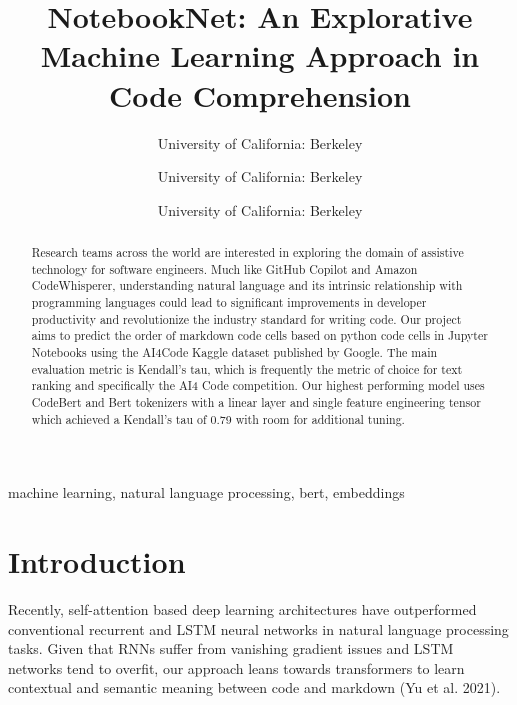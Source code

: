 \documentclass[conference]{IEEEtran}
\begin{document}
\title{NotebookNet: An Explorative Machine Learning Approach in Code Comprehension }

\author{
University of California: Berkeley
\and
{}
University of California: Berkeley
\and
{}
University of California: Berkeley}

\maketitle

\thispagestyle{firstpagefooter}

\begin{abstract}
Research teams across the world are interested in exploring the domain of assistive technology for software engineers. Much like GitHub Copilot and Amazon CodeWhisperer, understanding natural language and its intrinsic relationship with programming languages could lead to significant improvements in developer productivity and revolutionize the industry standard for writing code. Our project aims to predict the order of markdown code cells based on python code cells in Jupyter Notebooks using the AI4Code Kaggle dataset published by Google. The main evaluation metric is Kendall’s tau, which is frequently the metric of choice for text ranking and specifically the AI4 Code competition. Our highest performing model uses CodeBert and Bert tokenizers with a linear layer and single feature engineering tensor which achieved a Kendall’s tau of 0.79 with room for additional tuning.
\end{abstract}

\begin{IEEEkeywords}
machine learning, natural language processing, bert, embeddings
\end{IEEEkeywords}



\section{Introduction}
Recently, self-attention based deep learning architectures have outperformed conventional recurrent and LSTM neural networks in natural language processing tasks. Given that RNNs suffer from vanishing gradient issues and LSTM networks tend to overfit, our approach leans towards transformers to learn contextual and semantic meaning between code and markdown (Yu et al. 2021).
\end{document}
